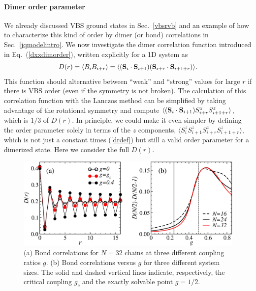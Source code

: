 \documentclass[draft,numberedheadings]{aipproc}
\begin{document}
\paragraph{Dimer order parameter}

We already discussed VBS ground states in Sec.~\ref{vbsrvb} and an example of how to characterize this kind of order by dimer (or bond) correlations in 
Sec.~\ref{jqmodelintro}. We now investigate the dimer correlation function introduced in Eq.~(\ref{dxxdimorder}), written explicitly for a 1D system as
\begin{equation}
D(r) = \langle B_iB_{i+r}\rangle =\langle ({\bf S}_i \cdot {\bf S}_{i+1})({\bf S}_{i+r} \cdot {\bf S}_{i+1+r}) \rangle.
\label{drdef}
\end{equation}
This function should alternative between ``weak'' and ``strong'' values for large $r$ if there is VBS order (even if the symmetry is not broken). The 
calculation of this correlation function with the Lanczos method can be simplified by taking advantage of the rotational symmetry and compute 
$\langle ({\bf S}_i \cdot {\bf S}_{i+1}){S}^z_{i+r}{S}^z_{i+1+r} \rangle$, which is $1/3$ of $D(r)$. In principle, we could make it even simpler by 
defining the order parameter solely in terms of the $z$ components, $\langle {S}^z_i{S}^z_{i+1}{S}^z_{i+r}{S}^z_{i+1+r} \rangle$, which is not just 
a constant times (\ref{drdef}) but still a valid order parameter for a dimerized state. Here we consider the full $D(r)$.

\begin{figure}
\includegraphics[width=12.5cm, clip]{dcor.eps}
\caption{(a) Bond correlations for $N=32$ chains at three different coupling ratios $g$. (b) Bond correlations versus $g$
for three different system sizes. The solid and dashed vertical lines indicate, respectively, the critical coupling $g_c$
and the exactly solvable point $g=1/2$.} 
\label{dcor}
\end{figure}
\end{document}
